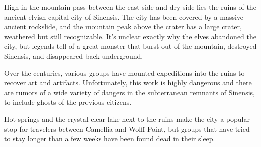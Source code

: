 High in the mountain pass between the east side and dry side lies the ruins of the ancient elvish capital city of Sinensis.
The city has been covered by a massive ancient rockslide, and the mountain peak above the crater has a large crater, weathered but still recognizable.
It's unclear exactly why the elves abandoned the city, but legends tell of a great monster that burst out of the mountain, destroyed Sinensis, and disappeared back underground.

Over the centuries, various groups have mounted expeditions into the ruins to recover art and artifacts.
Unfortunately, this work is highly dangerous and there are rumors of a wide variety of dangers in the subterranean remnants of Sinensis, to include ghosts of the previous citizens.

Hot springs and the crystal clear lake next to the ruins make the city a popular stop for travelers between Camellia and Wolff Point, but groups that have tried to stay longer than a few weeks have been found dead in their sleep.
